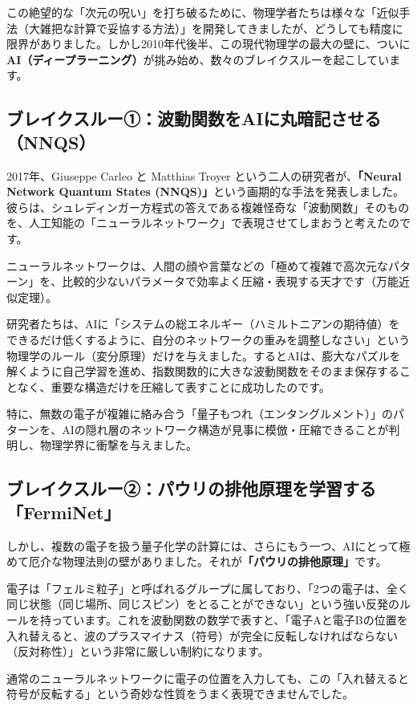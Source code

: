 この絶望的な「次元の呪い」を打ち破るために、物理学者たちは様々な「近似手法（大雑把な計算で妥協する方法）」を開発してきましたが、どうしても精度に限界がありました。しかし2010年代後半、この現代物理学の最大の壁に、ついに\textbf{AI（ディープラーニング）}が挑み始め、数々のブレイクスルーを起こしています。

\subsection{ブレイクスルー①：波動関数をAIに丸暗記させる（NNQS）}

2017年、Giuseppe Carleo と Matthias Troyer という二人の研究者が、\textbf{「Neural Network Quantum States (NNQS)」}という画期的な手法を発表しました。彼らは、シュレディンガー方程式の答えである複雑怪奇な「波動関数」そのものを、人工知能の「ニューラルネットワーク」で表現させてしまおうと考えたのです。

ニューラルネットワークは、人間の顔や言葉などの「極めて複雑で高次元なパターン」を、比較的少ないパラメータで効率よく圧縮・表現する天才です（万能近似定理）。

研究者たちは、AIに「システムの総エネルギー（ハミルトニアンの期待値）をできるだけ低くするように、自分のネットワークの重みを調整しなさい」という物理学のルール（変分原理）だけを与えました。するとAIは、膨大なパズルを解くように自己学習を進め、指数関数的に大きな波動関数をそのまま保存することなく、重要な構造だけを圧縮して表すことに成功したのです。

特に、無数の電子が複雑に絡み合う「量子もつれ（エンタングルメント）」のパターンを、AIの隠れ層のネットワーク構造が見事に模倣・圧縮できることが判明し、物理学界に衝撃を与えました。

\subsection{ブレイクスルー②：パウリの排他原理を学習する「FermiNet」}

しかし、複数の電子を扱う量子化学の計算には、さらにもう一つ、AIにとって極めて厄介な物理法則の壁がありました。それが\textbf{「パウリの排他原理」}です。

電子は「フェルミ粒子」と呼ばれるグループに属しており、「2つの電子は、全く同じ状態（同じ場所、同じスピン）をとることができない」という強い反発のルールを持っています。これを波動関数の数学で表すと、「電子Aと電子Bの位置を入れ替えると、波のプラスマイナス（符号）が完全に反転しなければならない（反対称性）」という非常に厳しい制約になります。

通常のニューラルネットワークに電子の位置を入力しても、この「入れ替えると符号が反転する」という奇妙な性質をうまく表現できませんでした。


